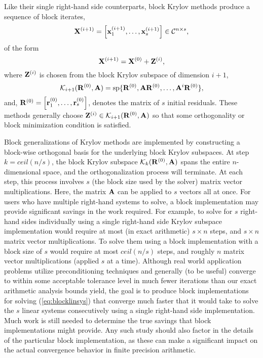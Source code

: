 \documentclass[twoside]{siamltex}
\newcommand{\bA}{{\bf A}}
\newcommand{\bZ}{{\bf Z}}
\newcommand{\bR}{{\bf R}}
\newcommand{\bX}{{\bf X}}
\newcommand{\bx}{{\bf x}}
\newcommand{\br}{{\bf r}}
\newcommand{\dm}{\begin{displaymath}}
\newcommand{\edm}{\end{displaymath}}
\begin{document}
Like their single right-hand side counterparts, block Krylov
methods produce a sequence of block iterates,
  \dm
 \bX^{(i+1)} = \left[ \bx_1^{(i+1)}, \ldots, \bx_s^{(i+1)}
 \right] \in {\cal C}^{n \times s},
 \edm
 of the form
  \dm
  \bX^{(i+1)} = \bX^{(0)} + \bZ^{(i)},
  \edm
 where $\bZ^{(i)}$ is chosen from the block Krylov subspace of
 dimension $i+1$,
  \dm
 {\cal K}_{i+1}(\bR^{(0)},\bA) = {\rm sp}\{\bR^{(0)},\bA
 \bR^{(0)},\ldots,\bA^{i}\bR^{(0)}\},
 \edm
and, $\bR^{(0)} = \left[ \br_1^{(0)}, \ldots, \br_s^{(0)}
\right]$, denotes the matrix of $s$ initial residuals. These
methods generally choose $\bZ^{(i)} \in {\cal
K}_{i+1}(\bR^{(0)},\bA)$ so that some orthogonality or block
minimization condition is satisfied.

Block generalizations of Krylov methods are implemented by
constructing a block-wise orthogonal basis for the underlying
block Krylov subspaces. At step {\small $k = ceil(n/s)$}, the
block Krylov subspace ${\cal K}_{k}(\bR^{(0)}, \bA)$ spans the
entire $n$-dimensional space, and the orthogonalization process
will terminate. At each step, this process involves $s$ (the block
size used by the solver) matrix vector multiplications. Here, the
matrix $\bA$ can be applied to $s$ vectors all at once. For users
who have multiple right-hand systems to solve, a block
implementation may provide significant savings in the work
required. For example, to solve for $s$ right-hand sides
individually using a single right-hand side Krylov subspace
implementation would require at most (in exact arithmetic) $s
\times n$ steps, and $s \times n$ matrix vector multiplications.
To solve them using a block implementation with a block size of
$s$ would require at most $ceil(n/s)$ steps, and roughly $n$
matrix vector multiplications (applied $s$ at a time). Although
real world application problems utilize preconditioning techniques
and generally (to be useful) converge to within some acceptable
tolerance level in much fewer iterations than our exact arithmetic
analysis bounds yield, the goal is to produce block
implementations for solving (\ref{eq:blocklinsys}) that converge
much faster that it would take to solve the $s$ linear systems
consecutively using a single right-hand side implementation. Much
work is still needed to determine the true savings that block
implementations might provide. Any such study should also factor
in the details of the particular block implementation, as these
can make a significant impact on the actual convergence behavior
in finite precision arithmetic.
\end{document}
